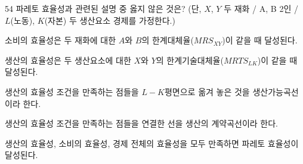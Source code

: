 \begin{question}{54}
파레토 효율성과 관련된 설명 중 옳지 않은 것은? (단, $X$, $Y$ 두 재화 / A, B 2인 / $L$(노동), $K$(자본) 두 생산요소 경제를 가정한다.)
\begin{choices}
  \item 소비의 효율성은 두 재화에 대한 $A$와 $B$의 한계대체율($MRS_{XY}$)이 같을 때 달성된다.
  \item 생산의 효율성은 두 생산요소에 대한 $X$와 $Y$의 한계기술대체율($MRTS_{LK}$)이 같을 때 달성된다.
  \item 생산의 효율성 조건을 만족하는 점들을 $L-K$평면으로 옮겨 놓은 것을 생산가능곡선이라 한다.
  \item 생산의 효율성 조건을 만족하는 점들을 연결한 선을 생산의 계약곡선이라 한다.
  \item 생산의 효율성, 소비의 효율성, 경제 전체의 효율성을 모두 만족하면 파레토 효율성이 달성된다.
\end{choices}
\end{question}

